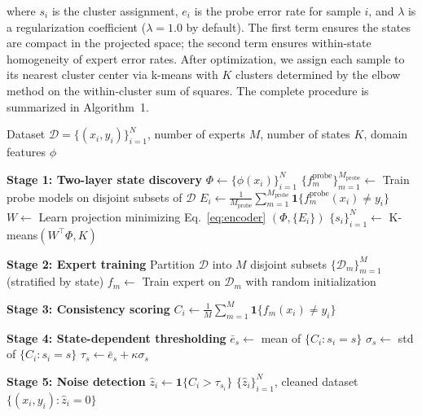where $s_i$ is the cluster assignment, $e_i$ is the probe error rate for sample $i$, and $\lambda$ is a regularization coefficient ($\lambda = 1.0$ by default). The first term ensures the states are compact in the projected space; the second term ensures within-state homogeneity of expert error rates. After optimization, we assign each sample to its nearest cluster center via k-means with $K$ clusters determined by the elbow method on the within-cluster sum of squares. The complete procedure is summarized in Algorithm~1.

\begin{algorithm}[t]
\caption{SCX: State-Conditioned eXpertise for Noise Detection}
\label{alg:scx}
\begin{algorithmic}[1]
\Require Dataset $\mathcal{D} = \{(x_i, y_i)\}_{i=1}^N$, number of experts $M$, number of states $K$, domain features $\phi$

\State \textbf{Stage 1: Two-layer state discovery}
\State $\Phi \gets \{\phi(x_i)\}_{i=1}^N$ 
\State $\{f_m^{\text{probe}}\}_{m=1}^{M_{\text{probe}}} \gets$ Train probe models on disjoint subsets of $\mathcal{D}$
\State $E_i \gets \frac{1}{M_{\text{probe}}}\sum_{m=1}^{M_{\text{probe}}} \mathbf{1}\{f_m^{\text{probe}}(x_i) \neq y_i\}$ 
\State $W \gets$ Learn projection minimizing Eq.~\eqref{eq:encoder} $(\Phi, \{E_i\})$
\State $\{s_i\}_{i=1}^N \gets$ K-means$(W^\top \Phi, K)$ 

\State \textbf{Stage 2: Expert training}
\State Partition $\mathcal{D}$ into $M$ disjoint subsets $\{\mathcal{D}_m\}_{m=1}^M$ (stratified by state)
\State $f_m \gets$ Train expert on $\mathcal{D}_m$ with random initialization
\EndFor

\State \textbf{Stage 3: Consistency scoring}
\State $C_i \gets \frac{1}{M}\sum_{m=1}^M \mathbf{1}\{f_m(x_i) \neq y_i\}$ 
\EndFor

\State \textbf{Stage 4: State-dependent thresholding}
\State $\bar{e}_s \gets$ mean of $\{C_i : s_i = s\}$
\State $\sigma_s \gets$ std of $\{C_i : s_i = s\}$
\State $\tau_s \gets \bar{e}_s + \kappa \sigma_s$ 
\EndFor

\State \textbf{Stage 5: Noise detection}
\State $\hat{z}_i \gets \mathbf{1}\{C_i > \tau_{s_i}\}$ 
\State \Return $\{\hat{z}_i\}_{i=1}^N$, cleaned dataset $\{(x_i, y_i) : \hat{z}_i = 0\}$
\end{algorithmic}
\end{algorithm}

